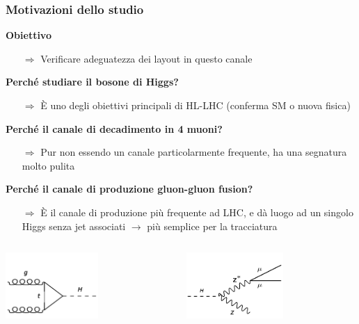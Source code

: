 \documentclass{beamer}
\begin{document}
\begin{frame}[t]
\frametitle{Motivazioni dello studio}

\textbf{\color{dred}Obiettivo}
\begin{itemize}
\item[\color{black}$\Rightarrow$] \small Verificare adeguatezza dei layout in questo canale
\end{itemize}
\medskip
\textbf{Perch\'e studiare il bosone di Higgs?}
\begin{itemize}
\item[\color{black}$\Rightarrow$] \small \`E uno degli obiettivi principali di HL-LHC (conferma SM o nuova fisica)
\end{itemize}

\textbf{Perch\'e il canale di decadimento in 4 muoni?}
\begin{itemize}
\item[\color{black}$\Rightarrow$] \small Pur non essendo un canale particolarmente frequente, ha una segnatura molto pulita
\end{itemize}

\textbf{Perch\'e il canale di produzione gluon-gluon fusion?}
\begin{itemize}
\item[\color{black}$\Rightarrow$] \small \`E il canale di produzione pi\`u frequente ad LHC, e d\`a luogo ad un singolo
Higgs senza jet associati $\rightarrow$ pi\`u semplice per la tracciatura
\end{itemize}

\begin{columns}
\begin{column}{.5\textwidth}
\centering
\includegraphics[width=.5\textwidth,height=2.5cm]{ggF2}
\end{column}
\begin{column}{.5\textwidth}
\centering
\includegraphics[width=.5\textwidth,height=2.5cm]{HZZ4mu_12}
\end{column}
\end{columns}

\end{frame}
\end{document}
